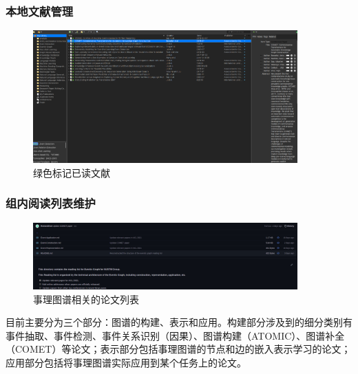 \documentclass[10pt,aspectratio=43,mathserif]{beamer}
\begin{document}
		\begin{frame}
		  \frametitle{\textbf{本地文献管理}}
            \begin{figure}[!t]
            \centering
            \includegraphics[width=4in]{figures/read.png}
            \caption{绿色标记已读文献}
            \label{fig:read}
            \end{figure}
		\end{frame}

		\begin{frame}
		  \frametitle{\textbf{组内阅读列表维护}}
            \begin{figure}[!t]
            \centering
            \includegraphics[width=4in]{figures/reading_list.png}
            \caption{事理图谱相关的论文列表}
            \label{fig:reading_list}
            \end{figure}
            目前主要分为三个部分：图谱的构建、表示和应用。构建部分涉及到的细分类别有事件抽取、事件检测、事件关系识别（因果）、图谱构建（ATOMIC）、图谱补全（COMET）等论文；表示部分包括事理图谱的节点和边的嵌入表示学习的论文；应用部分包括将事理图谱实际应用到某个任务上的论文。
		\end{frame}
		
\end{document}
